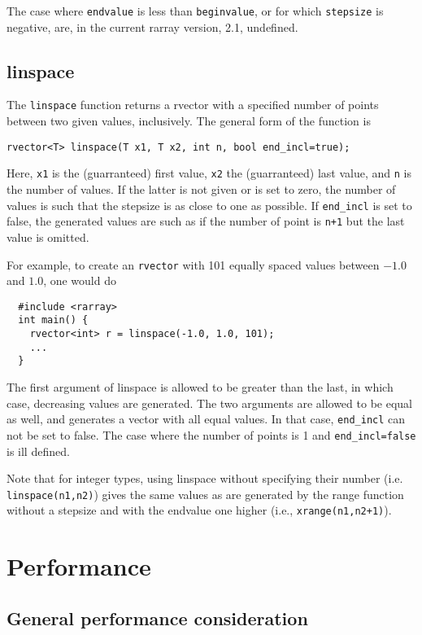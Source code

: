 \documentclass[11pt,twoside]{article}
\begin{document}
The case where \texttt{endvalue} is less than \texttt{beginvalue}, or
for which \texttt{stepsize} is negative, are, in the current rarray
version, 2.1, undefined.

\subsection{linspace}

The \texttt{linspace} function returns a rvector with a specified
number of points between two given values, inclusively.  The general
form of the function is
\begin{verbatim}
rvector<T> linspace(T x1, T x2, int n, bool end_incl=true);
\end{verbatim}
Here, \texttt{x1} is the (guarranteed) first value, \texttt{x2} the
(guarranteed) last value, and \texttt{n} is the number of values.  If
the latter is not given or is set to zero, the number of values is
such that the stepsize is as close to one as possible. If
\texttt{end\_incl} is set to false, the generated values are such as if
the number of point is \texttt{n+1} but the last value is omitted.

For example, to create an \texttt{rvector} with 101 equally spaced
values between $-1.0$ and $1.0$, one would do
\begin{verbatim}
  #include <rarray>
  int main() {
    rvector<int> r = linspace(-1.0, 1.0, 101);
    ...
  }
\end{verbatim}

The first argument of linspace is allowed to be greater than the last,
in which case, decreasing values are generated.  The two arguments are
allowed to be equal as well, and generates a vector with all equal values. In that case, \texttt{end\_incl} can not
be set to false. The case where the number of points is 1 and
\texttt{end\_incl=false} is ill defined.

Note that for integer types, using linspace without specifying their
number (i.e. \texttt{linspace(n1,n2)}) gives the same values as are
generated by the range function without a stepsize and with the
endvalue one higher (i.e., \texttt{xrange(n1,n2+1)}).


\section{Performance}

\subsection{General performance consideration}
\end{document}
